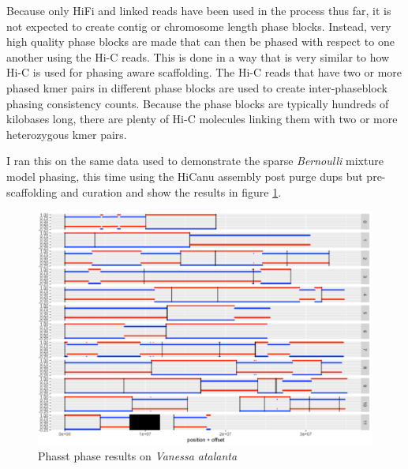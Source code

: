 {\par{
Because only HiFi and linked reads have been used in the process thus far, it is not expected to create contig or chromosome length phase blocks. Instead, very high quality phase blocks are made that  can then be phased with respect to one another using the Hi-C reads. This is done in a way that is very similar to how Hi-C is used for phasing aware scaffolding. The Hi-C reads that have two or more phased kmer pairs in different phase blocks are used to create inter-phaseblock phasing consistency counts. Because the phase blocks are typically hundreds of kilobases long, there are plenty of Hi-C molecules linking them with two or more heterozygous kmer pairs.
} 

\par{
I ran this on the same data used to demonstrate the sparse \textit{Bernoulli} mixture model phasing, this time using the HiCanu assembly post purge dups but pre-scaffolding and curation and show the results in figure \ref{figure:phasstphase}.
}


\begin{figure}[htbp!]
\caption{Phasst phase results on \textit{Vanessa atalanta}}
\label{figure:phasstphase}
\begin{centering}
\includegraphics[width=\textwidth]{phasstphase.png}
\end{centering}
\end{figure}

}

